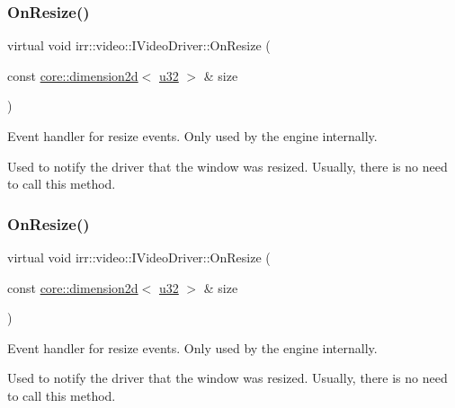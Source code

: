 \subsubsection{\texorpdfstring{On\+Resize()}{OnResize()}\hspace{0.1cm}{\footnotesize\ttfamily [1/2]}}
{\footnotesize\ttfamily virtual void irr\+::video\+::\+I\+Video\+Driver\+::\+On\+Resize (\begin{DoxyParamCaption}\item[{const \hyperlink{classirr_1_1core_1_1dimension2d}{core\+::dimension2d}$<$ \hyperlink{namespaceirr_a0416a53257075833e7002efd0a18e804}{u32} $>$ \&}]{size }\end{DoxyParamCaption})\hspace{0.3cm}{\ttfamily [pure virtual]}}



Event handler for resize events. Only used by the engine internally. 

Used to notify the driver that the window was resized. Usually, there is no need to call this method. \mbox{\label{classirr_1_1video_1_1IVideoDriver_a1a236e1233fc6fc2c5f36aaa830814fc}} 
\subsubsection{\texorpdfstring{On\+Resize()}{OnResize()}\hspace{0.1cm}{\footnotesize\ttfamily [2/2]}}
{\footnotesize\ttfamily virtual void irr\+::video\+::\+I\+Video\+Driver\+::\+On\+Resize (\begin{DoxyParamCaption}\item[{const \hyperlink{classirr_1_1core_1_1dimension2d}{core\+::dimension2d}$<$ \hyperlink{namespaceirr_a0416a53257075833e7002efd0a18e804}{u32} $>$ \&}]{size }\end{DoxyParamCaption})\hspace{0.3cm}{\ttfamily [pure virtual]}}



Event handler for resize events. Only used by the engine internally. 

Used to notify the driver that the window was resized. Usually, there is no need to call this method. \mbox{\label{classirr_1_1video_1_1IVideoDriver_adde468368b77441ada246e1603da4f47}} 
